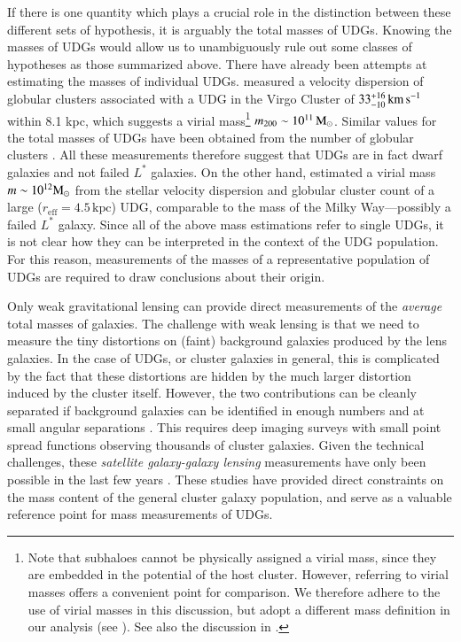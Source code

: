 \documentclass[usenatbib,fleqn]{mnras}
\def\reff{r_\mathrm{eff}}
\begin{document}
If there is one quantity which plays a crucial role in the distinction between these different sets of hypothesis, it is arguably the total masses of UDGs. Knowing the masses of UDGs would allow us to unambiguously rule out some classes of hypotheses as those summarized above. There have already been attempts at estimating the masses of individual UDGs. \cite{beasley16_virgo} measured a velocity dispersion of globular clusters associated with a UDG in the Virgo Cluster of $33_{-10}^{+16}\,\mathrm{km\,s^{-1}}$ within 8.1 kpc, which suggests a virial mass\footnote{Note that subhaloes cannot be physically assigned a virial mass, since they are embedded in the potential of the host cluster. However, referring to virial masses offers a convenient point for comparison. We therefore adhere to the use of virial masses in this discussion, but adopt a different mass definition in our analysis (see ). See also the discussion in \citet{sifon16_satellites}.} $m_{200}\sim10^{11}\,\mathrm{M}_\odot$. Similar values for the total masses of UDGs have been obtained from the number of globular clusters \citep{beasley16_acs,peng16}. All these measurements therefore suggest that UDGs are in fact dwarf galaxies and not failed $L^*$ galaxies. On the other hand, \cite{vandokkum16} estimated a virial mass $m\sim10^{12}\mathrm{M}_\odot$ from the stellar velocity dispersion and globular cluster count of a large ($\reff=4.5\,\mathrm{kpc}$) UDG, comparable to the mass of the Milky Way---possibly a failed $L^*$ galaxy. Since all of the above mass estimations refer to single UDGs, it is not clear how they can be interpreted in the context of the UDG population. For this reason, measurements of the masses of a representative population of UDGs are required to draw conclusions about their origin.

Only weak gravitational lensing can provide direct measurements of the \emph{average} total masses of galaxies. The challenge with weak lensing is that we need to measure the tiny distortions on (faint) background galaxies produced by the lens galaxies. In the case of UDGs, or cluster galaxies in general, this is complicated by the fact that these distortions are hidden by the much larger distortion induced by the cluster itself. However, the two contributions can be cleanly separated if background galaxies can be identified in enough numbers and at small angular separations \citep[$R\ll\langle\Rsat\rangle$, where $\langle\Rsat\rangle$ is the typical cluster-centric distance of the galaxies in question; see][]{yang06,sifon15_kids}. This requires deep imaging surveys with small point spread functions observing thousands of cluster galaxies. Given the technical challenges, these \emph{satellite galaxy-galaxy lensing} measurements have only been possible in the last few years \citep{li14,li16,sifon15_kids,sifon16_satellites}. These studies have provided direct constraints on the mass content of the general cluster galaxy population, and serve as a valuable reference point for mass measurements of UDGs.
\end{document}
